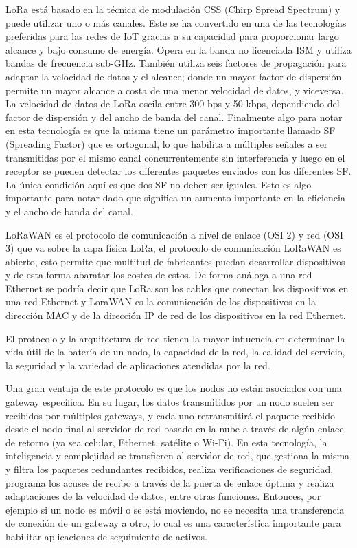 LoRa está basado en la técnica de modulación CSS (Chirp Spread Spectrum) y puede utilizar uno o más canales. Este se ha convertido en una de las tecnologías preferidas para las redes de IoT gracias a su capacidad para proporcionar largo alcance y bajo consumo de energía. Opera en la banda no licenciada ISM y utiliza bandas de frecuencia sub-GHz. También utiliza seis factores de propagación para adaptar la velocidad de datos y el alcance; donde un mayor factor de dispersión permite un mayor alcance a costa de una menor velocidad de datos, y viceversa. La velocidad de datos de LoRa oscila entre 300 bps y 50 kbps, dependiendo del factor  de dispersión y del ancho de banda del canal. Finalmente algo para notar en esta tecnología es que la misma tiene un parámetro importante llamado SF (Spreading Factor) que es ortogonal, lo que habilita a múltiples señales a ser transmitidas por el mismo canal concurrentemente sin interferencia y luego en el receptor se pueden detectar los diferentes paquetes enviados con los diferentes SF. La única condición aquí es que dos SF no deben ser iguales. Esto es algo importante para notar dado que significa un aumento importante en la eficiencia y el ancho de banda del canal.

LoRaWAN es el protocolo de comunicación a nivel de enlace (OSI 2) y red (OSI 3) que va sobre la capa física LoRa, el protocolo de comunicación LoRaWAN es abierto, esto permite que multitud de fabricantes puedan desarrollar dispositivos y de esta forma abaratar los costes de estos. De forma análoga a una red Ethernet se podría decir que LoRa son los cables que conectan los dispositivos en una red Ethernet y LoraWAN es la comunicación de los dispositivos en la dirección MAC y de la dirección IP de red de los dispositivos en la red Ethernet.

El protocolo y la arquitectura de red tienen la mayor influencia en determinar la vida útil de la batería de un nodo, la capacidad de la red, la calidad del servicio, la seguridad y la variedad de aplicaciones atendidas por la red.

Una gran ventaja de este protocolo es que los nodos no están asociados con una gateway específica. En su lugar, los datos transmitidos por un nodo suelen ser recibidos por múltiples gateways, y cada uno retransmitirá el paquete recibido desde el nodo final al servidor de red basado en la nube a través de algún enlace de retorno (ya sea celular, Ethernet, satélite o Wi-Fi). En esta tecnología, la inteligencia y complejidad se transfieren al servidor de red, que gestiona la misma y filtra los paquetes redundantes recibidos, realiza verificaciones de seguridad, programa los acuses de recibo a través de la puerta de enlace óptima y realiza adaptaciones de la velocidad de datos, entre otras funciones. Entonces, por ejemplo si un nodo es móvil o se está moviendo, no se necesita una transferencia de conexión de un gateway a otro, lo cual es una característica importante para habilitar aplicaciones de seguimiento de activos.

